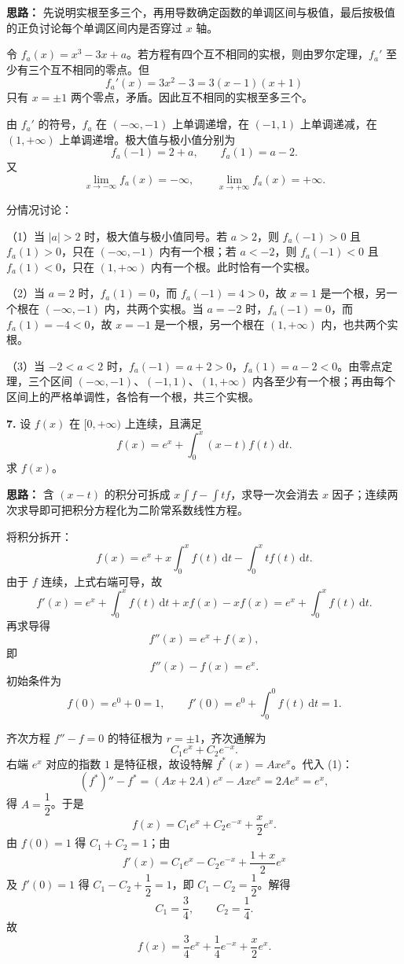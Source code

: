 \textbf{思路：} 先说明实根至多三个，再用导数确定函数的单调区间与极值，最后按极值的正负讨论每个单调区间内是否穿过 $x$ 轴。

令 $f_a(x)=x^3-3x+a$。若方程有四个互不相同的实根，则由罗尔定理，$f_a'$ 至少有三个互不相同的零点。但
\[
f_a'(x)=3x^2-3=3(x-1)(x+1)
\]
只有 $x=\pm1$ 两个零点，矛盾。因此互不相同的实根至多三个。

由 $f_a'$ 的符号，$f_a$ 在 $(-\infty,-1)$ 上单调递增，在 $(-1,1)$ 上单调递减，在 $(1,+\infty)$ 上单调递增。极大值与极小值分别为
\[
f_a(-1)=2+a,\qquad f_a(1)=a-2.
\]
又
\[
\lim_{x\to-\infty}f_a(x)=-\infty,\qquad
\lim_{x\to+\infty}f_a(x)=+\infty.
\]

分情况讨论：

（1）当 $|a|>2$ 时，极大值与极小值同号。若 $a>2$，则 $f_a(-1)>0$ 且 $f_a(1)>0$，只在 $(-\infty,-1)$ 内有一个根；若 $a<-2$，则 $f_a(-1)<0$ 且 $f_a(1)<0$，只在 $(1,+\infty)$ 内有一个根。此时恰有一个实根。

（2）当 $a=2$ 时，$f_a(1)=0$，而 $f_a(-1)=4>0$，故 $x=1$ 是一个根，另一个根在 $(-\infty,-1)$ 内，共两个实根。当 $a=-2$ 时，$f_a(-1)=0$，而 $f_a(1)=-4<0$，故 $x=-1$ 是一个根，另一个根在 $(1,+\infty)$ 内，也共两个实根。

（3）当 $-2<a<2$ 时，$f_a(-1)=a+2>0$，$f_a(1)=a-2<0$。由零点定理，三个区间 $(-\infty,-1)$、$(-1,1)$、$(1,+\infty)$ 内各至少有一个根；再由每个区间上的严格单调性，各恰有一个根，共三个实根。

\else \answerarea[10] \fi%

\textbf{7.} 设 $f(x)$ 在 $[0,+\infty)$ 上连续，且满足
\[
f(x)=e^x+\int_0^x (x-t)f(t)\,\mathrm{d}t.
\]
求 $f(x)$。

\ifshowsolutions%

\textbf{思路：} 含 $(x-t)$ 的积分可拆成 $x\int f-\int tf$，求导一次会消去 $x$ 因子；连续两次求导即可把积分方程化为二阶常系数线性方程。

将积分拆开：
\[
f(x)=e^x+x\int_0^x f(t)\,\mathrm{d}t-\int_0^x tf(t)\,\mathrm{d}t.
\]
由于 $f$ 连续，上式右端可导，故
\[
f'(x)=e^x+\int_0^x f(t)\,\mathrm{d}t+x f(x)-x f(x)
=e^x+\int_0^x f(t)\,\mathrm{d}t.
\]
再求导得
\[
f''(x)=e^x+f(x),
\]
即
\[
f''(x)-f(x)=e^x. \tag{1}
\]
初始条件为
\[
f(0)=e^0+0=1,\qquad f'(0)=e^0+\int_0^0f(t)\,\mathrm{d}t=1.
\]

齐次方程 $f''-f=0$ 的特征根为 $r=\pm1$，齐次通解为
\[
C_1e^x+C_2e^{-x}.
\]
右端 $e^x$ 对应的指数 $1$ 是特征根，故设特解 $f^*(x)=Axe^x$。代入 (1)：
\[
(f^*)''-f^*=(Ax+2A)e^x-Axe^x=2Ae^x=e^x,
\]
得 $A=\dfrac12$。于是
\[
f(x)=C_1e^x+C_2e^{-x}+\frac{x}{2}e^x.
\]
由 $f(0)=1$ 得 $C_1+C_2=1$；由
\[
f'(x)=C_1e^x-C_2e^{-x}+\frac{1+x}{2}e^x
\]
及 $f'(0)=1$ 得 $C_1-C_2+\dfrac12=1$，即 $C_1-C_2=\dfrac12$。解得
\[
C_1=\frac34,\qquad C_2=\frac14.
\]
故
\[
f(x)=\frac34e^x+\frac14e^{-x}+\frac{x}{2}e^x.
\]

